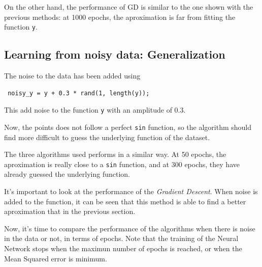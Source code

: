 \documentclass[10pt]{article}
\begin{document}
\begin{multicols}{2}
\begin{itemize}
On the other hand, the performance of GD is similar to the one shown with the previous methods: at 1000 epochs,
the aproximation is far from fitting the function \texttt{y}.

\end{itemize}

\subsection*{Learning from noisy data: Generalization}

The noise to the data has been added using

\begin{verbatim}
 noisy_y = y + 0.3 * rand(1, length(y));
\end{verbatim}

This add noise to the function \texttt{y} with an amplitude of 0.3.

Now, the points does not follow a perfect \texttt{sin} function, so the algorithm should find more difficult to
guess the underlying function of the dataset.

The three algorithms used performs in a similar way. At 50 epochs, the aproximation is really close to a \texttt{sin} function, and at 300 epochs, they have already guessed the underlying function.

It's important to look at the performance of the \textit{Gradient Descent}. When noise is added to the function,
it can be seen that this method is able to find a better aproximation that in the previous section.

Now, it's time to compare the performance of the algorithms when there is noise in the data or not, in terms of epochs. Note that the training of the Neural Network stops when the maximun number of epochs is reached, or when the Mean Squared error is minimum.


\end{multicols}
\end{document}
